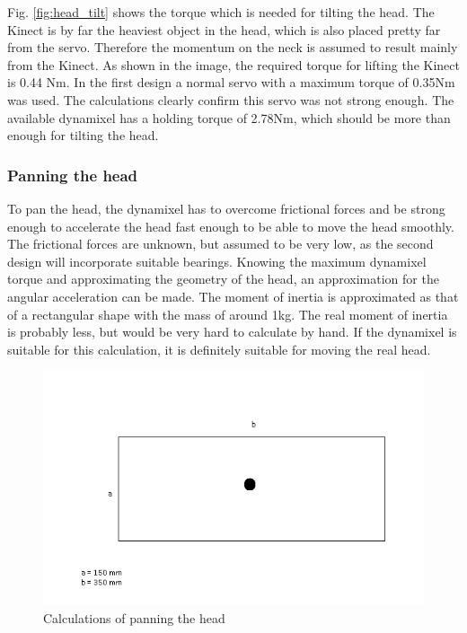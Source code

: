 \documentclass[technical_document.tex]{subfiles}
\begin{document}
Fig. \ref{fig:head_tilt} shows the torque which is needed for tilting the head. The Kinect is by far the heaviest object in the head, which is also placed pretty far from the servo. Therefore the momentum on the neck is assumed to result mainly from the Kinect. As shown in the image, the required torque for lifting the Kinect is 0.44 Nm. In the first design a normal servo with a maximum torque of 0.35Nm was used. The calculations clearly confirm this servo was not strong enough. The available dynamixel has a holding torque of 2.78Nm, which should be more than enough for tilting the head.

\subsubsection{Panning the head}

To pan the head, the dynamixel has to overcome frictional forces and be strong enough to accelerate the head fast enough to be able to move the head smoothly. The frictional forces are unknown, but assumed to be very low, as the second design will incorporate suitable bearings.
Knowing the maximum dynamixel torque and approximating the geometry of the head, an approximation for the angular acceleration can be made. The moment of inertia is approximated as that of a rectangular shape with the mass of around 1kg. The real moment of inertia is probably less, but would be very hard to calculate by hand. If the dynamixel is suitable for this calculation, it is definitely suitable for moving the real head.

\begin{figure}[ht!]
	\centering
	\mbox{\includegraphics[scale=0.4]{Images/head_pan.png}}
	\caption{Calculations of panning the head}
	\label{fig:head_pan}
\end{figure}
\end{document}
